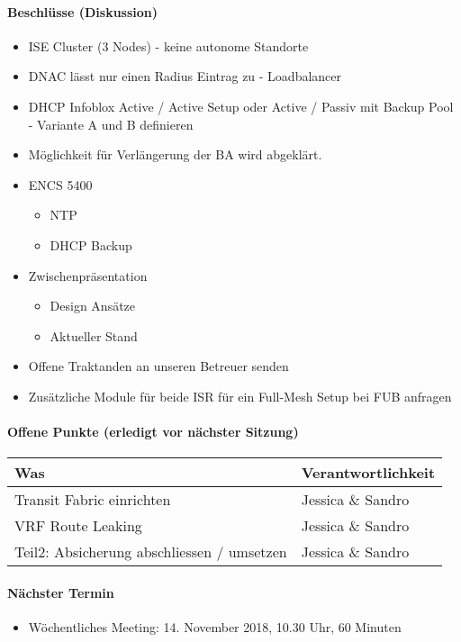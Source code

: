 \paragraph{Beschlüsse (Diskussion)}
\begin{itemize}	
	\item ISE Cluster (3 Nodes) - keine autonome Standorte
	\item DNAC lässt nur einen Radius Eintrag zu - Loadbalancer
	\item DHCP Infoblox Active / Active Setup oder Active / Passiv mit Backup Pool - Variante A und B definieren
	\item Möglichkeit für Verlängerung der BA wird abgeklärt. 
	\item ENCS 5400
	\begin{itemize}
		\item NTP
		\item DHCP Backup
	\end{itemize}
	\item Zwischenpräsentation
	\begin{itemize}
		\item Design Ansätze
		\item Aktueller Stand
	\end{itemize}
	\item Offene Traktanden an unseren Betreuer senden
	\item Zusätzliche Module für beide ISR für ein Full-Mesh Setup bei FUB anfragen
\end{itemize}

\paragraph{Offene Punkte (erledigt vor nächster Sitzung)} \mbox{}
\begin{table}[H]
	\centering
	\begin{tabularx}{\textwidth}{X | p{4.5cm}}
		\rowcolor{gray!50}
		\textbf{Was} & \textbf{Verantwortlichkeit} \\
		\hline	
		Transit Fabric einrichten & Jessica \& Sandro  \\
		VRF Route Leaking & Jessica \& Sandro \\
		Teil2: Absicherung abschliessen / umsetzen & Jessica \& Sandro \\
	\end{tabularx}
	\label{tab:my-label}
\end{table}

\paragraph{Nächster Termin}
\begin{itemize}	
	\item Wöchentliches Meeting: 14. November 2018, 10.30 Uhr, 60 Minuten
\end{itemize}

